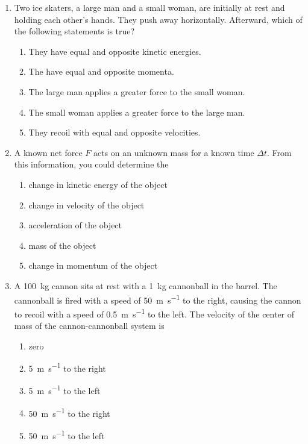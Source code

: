 \documentclass{../../../oss-apphys}
\begin{document}
\begin{multicols*}{2}
\begin{enumerate}[leftmargin=18pt,resume]
  \item Two ice skaters, a large man and a small woman, are initially at rest
    and holding each other's hands. They push away horizontally. Afterward,
    which of the following statements is true?
    \begin{enumerate}[nosep,leftmargin=18pt,label=(\Alph*)]
    \item They have equal and opposite kinetic energies.
    \item The have equal and opposite momenta.
    \item The large man applies a greater force to the small woman.
    \item The small woman applies a greater force to the large man.
    \item They recoil with equal and opposite velocities.
    \end{enumerate}
    \vspace{.8in}
    
  \item A known net force $F$ acts on an unknown mass for a known time
    $\Delta t$. From this information, you could determine the
    \begin{enumerate}[nosep,leftmargin=18pt,label=(\Alph*)]
    \item change in kinetic energy of the object
    \item change in velocity of the object
    \item acceleration of the object
    \item mass of the object
    \item change in momentum of the object
    \end{enumerate}
    \vspace{.8in}
    
  \item A \SI{100}{\kilo\gram} cannon sits at rest with a \SI{1}{\kilo\gram}
    cannonball in the barrel. The cannonball is fired with a speed of
    \SI{50}{\metre\per\second} to the right, causing the cannon to recoil with
    a speed of \SI{.5}{\metre\per\second} to the left. The velocity of the
    center of mass of the cannon-cannonball system is
    \begin{enumerate}[nosep,leftmargin=18pt,label=(\Alph*)]
    \item zero
    \item\SI{5}{\metre\per\second} to the right
    \item\SI{5}{\metre\per\second} to the left
    \item\SI{50}{\metre\per\second} to the right
    \item\SI{50}{\metre\per\second} to the left
    \end{enumerate}
  \end{enumerate}
  \columnbreak


\end{multicols*}
\end{document}
